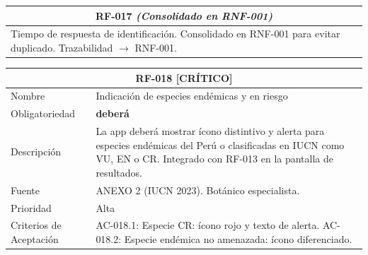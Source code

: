 \documentclass[12pt, a4paper]{article}
\newcommand{\criticomark}{\textcolor{criticolor}{\textbf{[CR\'ITICO]}}}
\begin{document}
\begin{longtable}{|p{3cm}|p{11.5cm}|}
\hline
\multicolumn{2}{|c|}{\textbf{RF-017} \textit{(Consolidado en RNF-001)}} \\
\hline
\multicolumn{2}{|p{14.5cm}|}{Tiempo de respuesta de identificaci\'on. Consolidado en RNF-001 para evitar duplicado. Trazabilidad $\rightarrow$ RNF-001.} \\
\hline
\end{longtable}

\begin{longtable}{|p{3cm}|p{11.5cm}|}
\hline
\multicolumn{2}{|c|}{\textbf{RF-018} \criticomark} \\
\hline
Nombre & Indicaci\'on de especies end\'emicas y en riesgo \\
\hline
Obligatoriedad & \textbf{deber\'a} \\
\hline
Descripci\'on & La app deber\'a mostrar \'icono distintivo y alerta para especies end\'emicas del Per\'u o clasificadas en IUCN como VU, EN o CR. Integrado con RF-013 en la pantalla de resultados. \\
\hline
Fuente & ANEXO 2 (IUCN 2023). Bot\'anico especialista. \\
\hline
Prioridad & Alta \\
\hline
Criterios de Aceptaci\'on &
AC-018.1: Especie CR: \'icono rojo y texto de alerta. \newline
AC-018.2: Especie end\'emica no amenazada: \'icono diferenciado. \\
\hline
\end{longtable}
\end{document}
